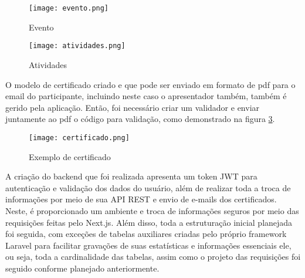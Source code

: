 \begin{figure}[H]
    \caption{\label{evento}Evento}
    \vspace{5pt}
    \centering
    \texttt{[image: evento.png]}
    \vspace{5pt}
\end{figure}
\begin{figure}[H]
    \caption{\label{atividades}Atividades}
    \vspace{5pt}
    \centering
    \texttt{[image: atividades.png]}
    \vspace{5pt}
\end{figure}
O modelo de certificado criado e que pode ser enviado em formato de pdf para o email do participante, incluindo neste caso o apresentador também, também é gerido pela aplicação. Então, foi necessário criar um validador e enviar juntamente ao pdf o código para validação, como demonstrado na figura \ref{certificado}.

\begin{figure}[H]
    \caption{\label{certificado}Exemplo de certificado}
    \vspace{5pt}
    \centering
    \texttt{[image: certificado.png]}
    \vspace{5pt}
\end{figure}

A criação do backend que foi realizada apresenta um token JWT para autenticação e validação dos dados do usuário, além de realizar toda a troca de informações por meio de sua API REST e envio de e-mails dos certificados. Neste, é proporcionado um ambiente e troca de informações seguros por meio das requisições feitas pelo Next.js. Além disso, toda a estruturação inicial planejada foi seguida, com exceções de tabelas auxiliares criadas pelo próprio framework Laravel para facilitar gravações de suas estatísticas e informações essenciais ele, ou seja, toda a cardinalidade das tabelas, assim como o projeto das requisições foi seguido conforme planejado anteriormente.

